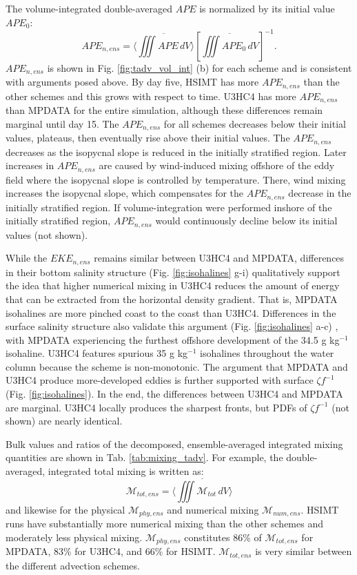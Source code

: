 The volume-integrated double-averaged $APE$ is normalized by its initial value $APE_0$:
\begin{equation}
    APE_{n, ens} = \langle \overline{\iiint APE \, dV} \rangle \left[\overline{\iiint APE_0 \,dV}\right]^{-1}.
\end{equation}
$APE_{n, ens}$ is shown in Fig. \ref{fig:tadv_vol_int} (b) for each scheme and is consistent with arguments posed above. By day five, HSIMT has more $APE_{n, ens}$ than the other schemes and this grows with respect to time. U3HC4 has more $APE_{n, ens}$ than MPDATA for the entire simulation, although these differences remain marginal until day 15. The $APE_{n, ens}$ for all schemes decreases below their initial values, plateaus, then eventually rise above their initial values. The $APE_{n, ens}$ decreases as the isopycnal slope is reduced in the initially stratified region. Later increases in $APE_{n, ens}$ are caused by wind-induced mixing offshore of the eddy field where the isopycnal slope is controlled by temperature. There, wind mixing increases the isopycnal slope, which compensates for the $APE_{n, ens}$ decrease in the initially stratified region. If volume-integration were performed inshore of the initially stratified region, $APE_{n, ens}$ would continuously decline below its initial values (not shown). 

While the $EKE_{n, ens}$ remains similar between U3HC4 and MPDATA, differences in their bottom salinity structure (Fig. \ref{fig:isohalines} g-i) qualitatively support the idea that higher numerical mixing in U3HC4 reduces the amount of energy that can be extracted from the horizontal density gradient. That is, MPDATA isohalines are more pinched coast to the coast than U3HC4. Differences in the surface salinity structure also validate this argument (Fig. \ref{fig:isohalines} a-c) , with MPDATA experiencing the furthest offshore development of the 34.5 g kg$^{-1}$ isohaline. U3HC4 features spurious 35 g kg$^{-1}$ isohalines throughout the water column because the scheme is non-monotonic.  The argument that MPDATA and U3HC4 produce more-developed eddies is further supported with surface $\zeta f^{-1}$ (Fig. \ref{fig:isohalines}). In the end, the differences between U3HC4 and MPDATA are marginal. U3HC4 locally produces the sharpest fronts, but PDFs of $\zeta f^{-1}$ (not shown) are nearly identical.

Bulk values and ratios of the decomposed, ensemble-averaged integrated mixing quantities are shown in Tab. \ref{tab:mixing_tadv}. For example, the double-averaged, integrated total mixing is written as:
\begin{equation}
    \mathcal{M}_{tot,ens} = \langle \overline{\iiint \mathcal{M}_{tot} \, dV } \rangle
\end{equation}
and likewise for the physical $\mathcal{M}_{phy, ens}$ and numerical mixing $\mathcal{M}_{num,ens}$. HSIMT runs have substantially more numerical mixing than the other schemes and moderately less physical mixing. $\mathcal{M}_{phy,ens}$ constitutes 86\% of $\mathcal{M}_{tot,ens}$ for MPDATA, 83\% for U3HC4, and 66\% for HSIMT. $\mathcal{M}_{tot,ens}$ is very similar between the different advection schemes. 

